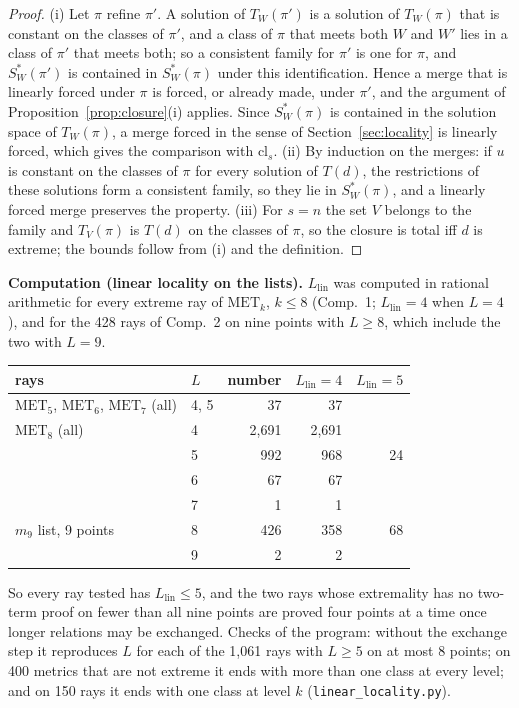 \documentclass[11pt,a4paper]{article}
\theoremstyle{definition}
\theoremstyle{remark}
\newcommand{\MET}{\mathrm{MET}}
\newcommand{\cl}{\mathrm{cl}}
\newcommand{\file}[1]{\texttt{#1}}
\newcommand{\comp}[1]{\medskip\noindent\textbf{#1}}
\begin{document}
\begin{proof}
(i) Let $\pi$ refine $\pi'$. A solution of $T_W(\pi')$ is a solution of $T_W(\pi)$ that is constant on the classes
of $\pi'$, and a class of $\pi$ that meets both $W$ and $W'$ lies in a class of $\pi'$ that meets both; so a
consistent family for $\pi'$ is one for $\pi$, and $S^*_W(\pi')$ is contained in $S^*_W(\pi)$ under this
identification. Hence a merge that is linearly forced under $\pi$ is forced, or already made, under $\pi'$, and
the argument of Proposition~\ref{prop:closure}(i) applies. Since $S^*_W(\pi)$ is contained in the solution space of
$T_W(\pi)$, a merge forced in the sense of Section~\ref{sec:locality} is linearly forced, which gives the
comparison with $\cl_s$. (ii) By induction on the merges: if $u$ is constant on the classes of $\pi$ for every
solution of $T(d)$, the restrictions of these solutions form a consistent family, so they lie in $S^*_W(\pi)$, and a
linearly forced merge preserves the property. (iii) For $s = n$ the set $V$ belongs to the family and $T_V(\pi)$ is
$T(d)$ on the classes of $\pi$, so the closure is total iff $d$ is extreme; the bounds follow from (i) and the
definition.
\end{proof}

\comp{Computation (linear locality on the lists).} $L_{\mathrm{lin}}$ was computed in rational arithmetic for
every extreme ray of $\MET_k$, $k \le 8$ (Comp.~1; $L_{\mathrm{lin}} = 4$ when $L = 4$), and for the 428 rays of
Comp.~2 on nine points with $L \ge 8$, which include the two with $L = 9$.
\begin{center}
\begin{tabular}{llrrr}
\toprule
rays & $L$ & number & $L_{\mathrm{lin}} = 4$ & $L_{\mathrm{lin}} = 5$ \\
\midrule
$\MET_5$, $\MET_6$, $\MET_7$ (all) & 4, 5 & 37 & 37 & \\
$\MET_8$ (all) & 4 & 2,691 & 2,691 & \\
 & 5 & 992 & 968 & 24 \\
 & 6 & 67 & 67 & \\
 & 7 & 1 & 1 & \\
$m_9$ list, 9 points & 8 & 426 & 358 & 68 \\
 & 9 & 2 & 2 & \\
\bottomrule
\end{tabular}
\end{center}
So every ray tested has $L_{\mathrm{lin}} \le 5$, and the two rays whose extremality has no two-term proof on fewer
than all nine points are proved four points at a time once longer relations may be exchanged. Checks of the
program: without the exchange step it reproduces $L$ for each of the 1,061 rays with $L \ge 5$ on at most 8 points;
on 400 metrics that are not extreme it ends with more than one class at every level; and on 150 rays it ends with
one class at level $k$ (\file{linear\_locality.py}).
\end{document}
